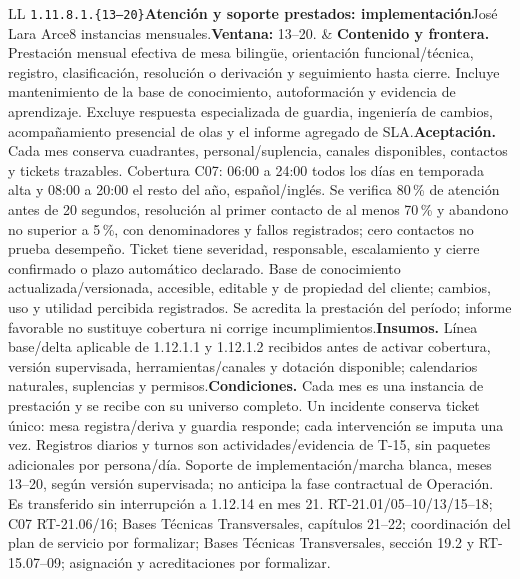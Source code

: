 \begin{longtable}{L{\tabcolsep\relax}L{\tabcolsep\relax}}
\texttt{1.\allowbreak{}11.\allowbreak{}8.\allowbreak{}1.\allowbreak{}\{13--20\}}\newline{}\textbf{Atención y soporte prestados: implementación}\newline{}José Lara Arce\newline{}8 instancias mensuales.\newline{}\textbf{Ventana:} 13--20. & \textbf{Contenido y frontera.} Prestación mensual efectiva de mesa bilingüe, orientación funcional/técnica, registro, clasificación, resolución o derivación y seguimiento hasta cierre. Incluye mantenimiento de la base de conocimiento, autoformación y evidencia de aprendizaje. Excluye respuesta especializada de guardia, ingeniería de cambios, acompañamiento presencial de olas y el informe agregado de SLA.\newline{}\textbf{Aceptación.} Cada mes conserva cuadrantes, personal/suplencia, canales disponibles, contactos y tickets trazables. Cobertura C07: 06:00 a 24:00 todos los días en temporada alta y 08:00 a 20:00 el resto del año, español/inglés. Se verifica 80\,\% de atención antes de 20 segundos, resolución al primer contacto de al menos 70\,\% y abandono no superior a 5\,\%, con denominadores y fallos registrados; cero contactos no prueba desempeño. Ticket tiene severidad, responsable, escalamiento y cierre confirmado o plazo automático declarado. Base de conocimiento actualizada/versionada, accesible, editable y de propiedad del cliente; cambios, uso y utilidad percibida registrados. Se acredita la prestación del período; informe favorable no sustituye cobertura ni corrige incumplimientos.\newline{}\textbf{Insumos.} Línea base/delta aplicable de 1.12.1.1 y 1.12.1.2 recibidos antes de activar cobertura, versión supervisada, herramientas/canales y dotación disponible; calendarios naturales, suplencias y permisos.\newline{}\textbf{Condiciones.} Cada mes es una instancia de prestación y se recibe con su universo completo. Un incidente conserva ticket único: mesa registra/deriva y guardia responde; cada intervención se imputa una vez. Registros diarios y turnos son actividades/evidencia de T-15, sin paquetes adicionales por persona/día. Soporte de implementación/marcha blanca, meses 13--20, según versión supervisada; no anticipa la fase contractual de Operación. Es transferido sin interrupción a 1.12.14 en mes 21. RT-21.01/05--10/13/15--18; C07 RT-21.06/16; Bases Técnicas Transversales, capítulos 21--22; coordinación del plan de servicio por formalizar; Bases Técnicas Transversales, sección 19.2 y RT-15.07--09; asignación y acreditaciones por formalizar.\\\hline

\end{longtable}
